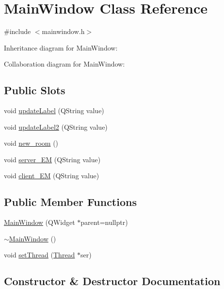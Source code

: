 \hypertarget{class_main_window}{}\section{Main\+Window Class Reference}
\label{class_main_window}


{\ttfamily \#include $<$mainwindow.\+h$>$}



Inheritance diagram for Main\+Window\+:


Collaboration diagram for Main\+Window\+:
\subsection*{Public Slots}
\begin{DoxyCompactItemize}
\item 
void \mbox{\hyperlink{class_main_window_ae0210b36ab2d1cce80443e36942e4ac7}{update\+Label}} (Q\+String value)
\item 
void \mbox{\hyperlink{class_main_window_a315247f5e13a056bb7b0eb9b7a1696a3}{update\+Label2}} (Q\+String value)
\item 
void \mbox{\hyperlink{class_main_window_a009cf1c98aea483a7e69beadd37198fc}{new\+\_\+room}} ()
\item 
void \mbox{\hyperlink{class_main_window_a49925c6b00f15c1d53039324c5527430}{server\+\_\+\+EM}} (Q\+String value)
\item 
void \mbox{\hyperlink{class_main_window_a413ee43572e60199c3c05beb320a49bb}{client\+\_\+\+EM}} (Q\+String value)
\end{DoxyCompactItemize}
\subsection*{Public Member Functions}
\begin{DoxyCompactItemize}
\item 
\mbox{\hyperlink{class_main_window_a996c5a2b6f77944776856f08ec30858d}{Main\+Window}} (Q\+Widget $\ast$parent=nullptr)
\item 
\mbox{\hyperlink{class_main_window_ae98d00a93bc118200eeef9f9bba1dba7}{$\sim$\+Main\+Window}} ()
\item 
void \mbox{\hyperlink{class_main_window_a251886b877d475b08cf0291c5529767e}{set\+Thread}} (\mbox{\hyperlink{class_thread}{Thread}} $\ast$ser)
\end{DoxyCompactItemize}


\subsection{Constructor \& Destructor Documentation}
\mbox{\label{class_main_window_a996c5a2b6f77944776856f08ec30858d}} 
